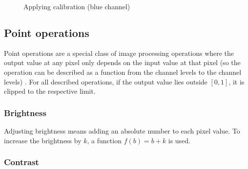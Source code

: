\documentclass{article}
\begin{document}
\begin{figure}[H]
    \centering
    \caption{Applying calibration (blue channel)}
\end{figure}

\subsection{Point operations}

Point operations are a special class of image processing operations where the output value
at any pixel only depends on the input value at that pixel (so the operation
can be described as a function from the channel levels to the channel levels) \cite{pointwise_gimp}.
For all described operations, if the output value lies outside $[0, 1]$,
it is clipped to the respective limit.

\subsubsection{Brightness}

Adjusting brightness means adding an absolute number to each pixel value.
To increase the brightness by $k$, a function $f(b) = b + k$ is used.

\subsubsection{Contrast}
\end{document}

